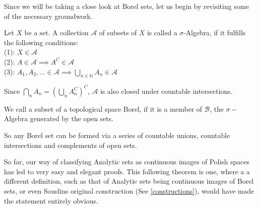 \documentclass[10pt, a4paper, titlepage]{article}
\numberwithin{equation}{section}
\begin{document}
Since we will be taking a close look at Borel sets, let us begin by revisiting some of the necessary groundwork.

\begin{definition}
	Let $X$ be a set. 
	A collection  $\mathcal{A}$ of subsets of  $X$ is
	called a  $\sigma$-Algebra, if it fulfills the
	following conditions:\\
	(1): $X \in \mathcal{A}$\\
	(2): $A \in \mathcal{A} \implies A^C \in \mathcal{A}$\\
	(3): $A_1,A_2,\ldots \in \mathcal{A} \implies
	\bigcup_{n \in \mathbb{N}} A_n \in \mathcal{A}$ 
\end{definition}

Since $\bigcap_{n} A_n = \left( \bigcup_n A_n^C\right)^C $,
$\mathcal{A}$ is also closed under countable intersections.


\begin{definition}
	We call a subset of a topological space Borel, if it is a member of $\mathcal{B}$, the $\sigma-$Algebra generated by the open sets.
\end{definition}

So any Borel set can be formed via a series of countable unions,
countable intersections and complements of open sets.

So far, our way of classifying Analytic sets as continuous
images of Polish spaces has led to very easy and elegant
proofs. 
This following theorem is one, where a a different
definition, such as that of Analytic sets being continuous
images of Borel sets, or even Souslins original
construction (See \autoref{constructions}), would have made the statement entirely
obvious. 
\end{document}
